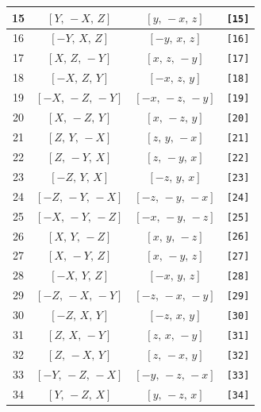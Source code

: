 \documentclass[fleqn,8pt]{jsarticle}
\begin{document}
\begin{longtable}{cccc}
15 & $\left[ Y,\, - X,\, Z \right]$ & $\left[ y,\, - x,\, z \right]$ & {\tt [15]} \\ \hline
16 & $\left[ - Y,\, X,\, Z \right]$ & $\left[ - y,\, x,\, z \right]$ & {\tt [16]} \\ \hline
17 & $\left[ X,\, Z,\, - Y \right]$ & $\left[ x,\, z,\, - y \right]$ & {\tt [17]} \\ \hline
18 & $\left[ - X,\, Z,\, Y \right]$ & $\left[ - x,\, z,\, y \right]$ & {\tt [18]} \\ \hline
19 & $\left[ - X,\, - Z,\, - Y \right]$ & $\left[ - x,\, - z,\, - y \right]$ & {\tt [19]} \\ \hline
20 & $\left[ X,\, - Z,\, Y \right]$ & $\left[ x,\, - z,\, y \right]$ & {\tt [20]} \\ \hline
21 & $\left[ Z,\, Y,\, - X \right]$ & $\left[ z,\, y,\, - x \right]$ & {\tt [21]} \\ \hline
22 & $\left[ Z,\, - Y,\, X \right]$ & $\left[ z,\, - y,\, x \right]$ & {\tt [22]} \\ \hline
23 & $\left[ - Z,\, Y,\, X \right]$ & $\left[ - z,\, y,\, x \right]$ & {\tt [23]} \\ \hline
24 & $\left[ - Z,\, - Y,\, - X \right]$ & $\left[ - z,\, - y,\, - x \right]$ & {\tt [24]} \\ \hline
25 & $\left[ - X,\, - Y,\, - Z \right]$ & $\left[ - x,\, - y,\, - z \right]$ & {\tt [25]} \\ \hline
26 & $\left[ X,\, Y,\, - Z \right]$ & $\left[ x,\, y,\, - z \right]$ & {\tt [26]} \\ \hline
27 & $\left[ X,\, - Y,\, Z \right]$ & $\left[ x,\, - y,\, z \right]$ & {\tt [27]} \\ \hline
28 & $\left[ - X,\, Y,\, Z \right]$ & $\left[ - x,\, y,\, z \right]$ & {\tt [28]} \\ \hline
29 & $\left[ - Z,\, - X,\, - Y \right]$ & $\left[ - z,\, - x,\, - y \right]$ & {\tt [29]} \\ \hline
30 & $\left[ - Z,\, X,\, Y \right]$ & $\left[ - z,\, x,\, y \right]$ & {\tt [30]} \\ \hline
31 & $\left[ Z,\, X,\, - Y \right]$ & $\left[ z,\, x,\, - y \right]$ & {\tt [31]} \\ \hline
32 & $\left[ Z,\, - X,\, Y \right]$ & $\left[ z,\, - x,\, y \right]$ & {\tt [32]} \\ \hline
33 & $\left[ - Y,\, - Z,\, - X \right]$ & $\left[ - y,\, - z,\, - x \right]$ & {\tt [33]} \\ \hline
34 & $\left[ Y,\, - Z,\, X \right]$ & $\left[ y,\, - z,\, x \right]$ & {\tt [34]} \\ \hline

\end{longtable}
\end{document}
